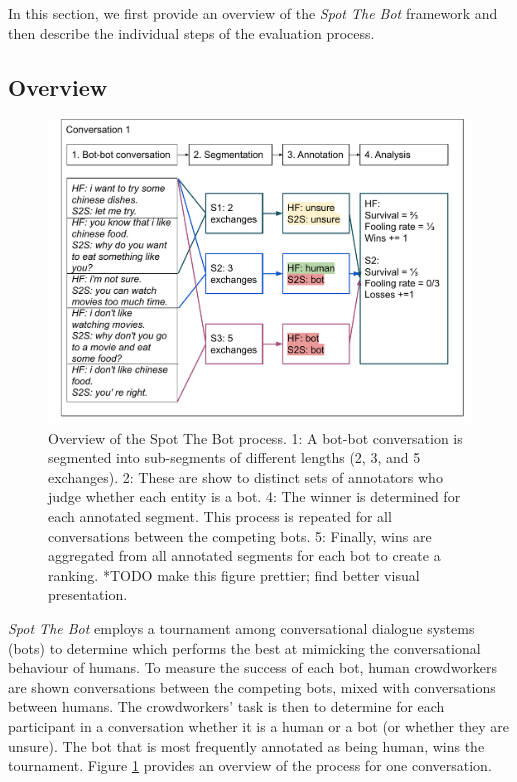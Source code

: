 \documentclass[11pt,a4paper]{article}
\begin{document}
In this section, we first provide an overview of the \emph{Spot The Bot} framework and then describe the individual steps of the evaluation process.

\subsection{Overview}
\begin{figure}
    \centering
    \includegraphics[width=0.7\linewidth]{figures/Spot the bot - annotation example - sketch3.pdf}
    \caption{Overview of the Spot The Bot process. 1: A bot-bot conversation is segmented into sub-segments of different lengths (2, 3, and 5 exchanges). 2: These are show to distinct sets of annotators who judge whether each entity is a bot. 4: The winner is determined for each annotated segment. This process is repeated for all conversations between the competing bots. 5: Finally, wins are aggregated from all annotated segments for each bot to create a ranking. *TODO make this figure prettier; find better visual presentation.}
    \label{fig:example}
\end{figure}
\emph{Spot The Bot} employs a tournament among conversational dialogue systems (bots) to determine which performs the best at mimicking the conversational behaviour of humans. To measure the success of each bot, human crowdworkers are shown conversations between the competing bots, mixed with conversations between humans. The crowdworkers' task is then to determine for each participant in a conversation whether it is a human or a bot (or whether they are unsure). The bot that is most frequently annotated as being human, wins the tournament. Figure \ref{fig:example} provides an overview of the process for one conversation.
\end{document}
